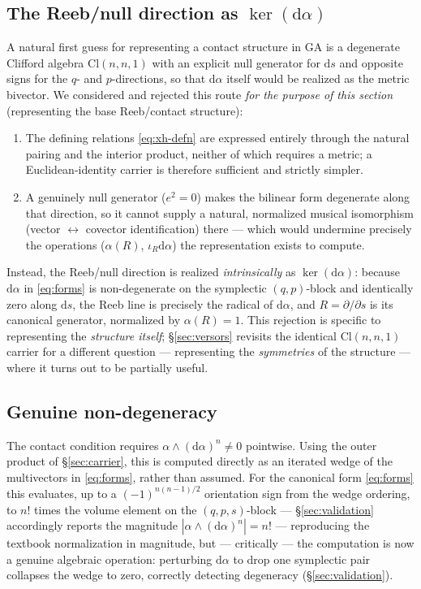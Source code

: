 \documentclass[11pt]{article}
\newcommand{\Cl}{\mathrm{Cl}}
\newcommand{\dif}{\mathrm{d}}
\begin{document}
\subsection{The Reeb/null direction as \texorpdfstring{$\ker(\dif\alpha)$}{ker(dα)}}
\label{sec:reeb-direction}

A natural first guess for representing a contact structure in GA is a degenerate Clifford algebra $\Cl(n,n,1)$ with an explicit null generator for $\dif s$ and opposite signs for the $q$- and $p$-directions, so that $\dif\alpha$ itself would be realized as the metric bivector. We considered and rejected this route \emph{for the purpose of this section} (representing the base Reeb/contact structure):
\begin{enumerate}[leftmargin=1.4em]
\item The defining relations \eqref{eq:xh-defn} are expressed entirely through the natural pairing and the interior product, neither of which requires a metric; a Euclidean-identity carrier is therefore sufficient and strictly simpler.
\item A genuinely null generator ($e^2=0$) makes the bilinear form degenerate along that direction, so it cannot supply a natural, normalized musical isomorphism (vector $\leftrightarrow$ covector identification) there — which would undermine precisely the operations ($\alpha(R)$, $\iota_R\dif\alpha$) the representation exists to compute.
\end{enumerate}
Instead, the Reeb/null direction is realized \emph{intrinsically} as $\ker(\dif\alpha)$: because $\dif\alpha$ in \eqref{eq:forms} is non-degenerate on the symplectic $(q,p)$-block and identically zero along $\dif s$, the Reeb line is precisely the radical of $\dif\alpha$, and $R=\partial/\partial s$ is its canonical generator, normalized by $\alpha(R)=1$. This rejection is specific to representing the \emph{structure itself}; \S\ref{sec:versors} revisits the identical $\Cl(n,n,1)$ carrier for a different question — representing the \emph{symmetries} of the structure — where it turns out to be partially useful.

\subsection{Genuine non-degeneracy}

The contact condition requires $\alpha\wedge(\dif\alpha)^n \neq 0$ pointwise. Using the outer product of \S\ref{sec:carrier}, this is computed directly as an iterated wedge of the multivectors in \eqref{eq:forms}, rather than assumed. For the canonical form \eqref{eq:forms} this evaluates, up to a $(-1)^{n(n-1)/2}$ orientation sign from the wedge ordering, to $n!$ times the volume element on the $(q,p,s)$-block — \S\ref{sec:validation} accordingly reports the magnitude $|\alpha\wedge(\dif\alpha)^n|=n!$ — reproducing the textbook normalization in magnitude, but — critically — the computation is now a genuine algebraic operation: perturbing $\dif\alpha$ to drop one symplectic pair collapses the wedge to zero, correctly detecting degeneracy (\S\ref{sec:validation}).
\end{document}
